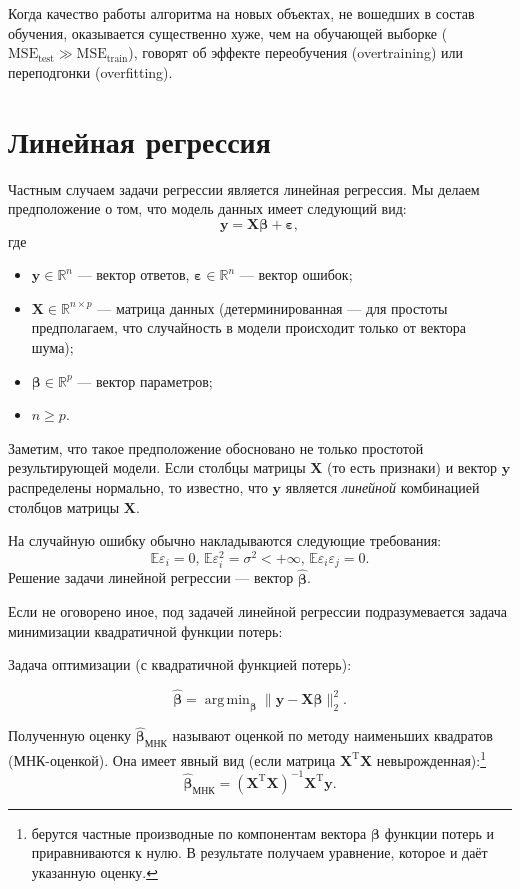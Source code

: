 \documentclass[12pt,a4paper,final]{article}
\newcommand{\betah}{\hat{\bm \beta}}
\newcommand{\betaa}{\bm{\beta}}
\newcommand{\epss}{\bm{\varepsilon}}
\newcommand{\XT}{{\bm{X}}^{\mathrm{T}}}
\newcommand{\X}{\bm{X}}
\newcommand{\y}{\bm{y}}
\newcommand{\1}{\mathds{1}}
\DeclareMathOperator*{\argmin}{arg\,min}
\begin{document}
Когда качество работы алгоритма на новых объектах, не вошедших в состав обучения, оказывается существенно хуже, чем на обучающей выборке ($\mathrm{MSE_{\text{test}}}\gg\mathrm{MSE}_{\text{train}}$), говорят об эффекте переобучения (overtraining) или переподгонки (overfitting).


\section{Линейная регрессия}

Частным случаем задачи регрессии является линейная регрессия. Мы делаем предположение о том, что модель данных имеет следующий вид:
\begin{equation}
	\bm y = \X \betaa + \epss,
\end{equation}
где 
\begin{itemize}
	\item $\bm y \in \mathbb R^n$ --- вектор ответов,  $\epss \in \mathbb R^n$ --- вектор ошибок;
	\item $\X \in \mathbb R^{n \times p}$ --- матрица данных (детерминированная --- для простоты предполагаем, что случайность в модели происходит только от вектора шума);

	\item $\betaa \in \mathbb R^p$ --- вектор параметров;
	\item $n\geqslant p.$
\end{itemize}

Заметим, что такое предположение обосновано не только простотой результирующей модели. Если столбцы матрицы $\X$ (то есть признаки) и вектор $\y$ распределены нормально, то известно, что $\y$ является \textit{линейной} 	комбинацией столбцов матрицы $\X$.


На случайную ошибку обычно накладываются следующие требования:
\begin{equation}
	\mathbb{E}\varepsilon_i = 0,\, \mathbb{E} \varepsilon_i^2 = \sigma^2 < +\infty,\,  \mathbb{E} \varepsilon_i \varepsilon_j = 0.
	\label{req:err}
\end{equation}
Решение задачи линейной регрессии --- вектор $\betah$. 

Если не оговорено иное, под задачей линейной регрессии подразумевается задача минимизации квадратичной функции потерь:

Задача оптимизации (с квадратичной функцией потерь):

$$\betah = \argmin_{\betaa}{\|\bm y - \bm X \betaa\|^2_2}.$$

Полученную оценку $\betah_{\text{МНК}}$ называют оценкой по методу наименьших квадратов (МНК-оценкой). Она имеет явный вид (если матрица $\XT \X$ невырожденная):\footnote{берутся частные производные по компонентам вектора $\betaa$ функции потерь и приравниваются к нулю. В результате получаем уравнение, которое и даёт указанную оценку.}
\begin{equation}
	\betah_{\text{МНК}} = (\XT \X)^{-1}\XT \y.
	\label{eq:lse}
\end{equation}
\end{document}
